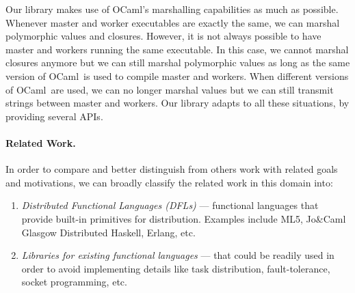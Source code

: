 \documentclass{llncs}
\newcommand{\Ocaml}{OCaml}
\newcommand{\functory}{\textsf{Functory}}
\newcommand{\JoCaml}{Jo{\&\!}Caml}
\begin{document}
Our library makes use of \Ocaml's marshalling capabilities as much as
possible. Whenever master and worker executables are exactly the same,
we can marshal polymorphic values and closures. However, it is not
always possible to have master and workers running the same
executable. In this case, we cannot marshal closures anymore but we
can still marshal polymorphic values as long as the same version of
\Ocaml\ is used to compile master and workers. When different versions
of \Ocaml\ are used, we can no longer marshal values but we can still
transmit strings between master and workers. Our library adapts to all
these situations, by providing several APIs.



\paragraph{Related Work.}
In order to compare and better distinguish
 from others work with related goals and motivations, we can
broadly classify the related work in this domain into:
\begin{enumerate}
\item \textit{Distributed Functional Languages (DFLs)} --- functional
  languages that provide built-in primitives for
  distribution. Examples include ML5, \JoCaml\, Glasgow Distributed
  Haskell, Erlang, etc.
\item \textit{Libraries for existing functional languages} --- that
  could be readily used in order to avoid implementing details like
  task distribution, fault-tolerance, socket programming, etc.
\end{enumerate}
\end{document}
